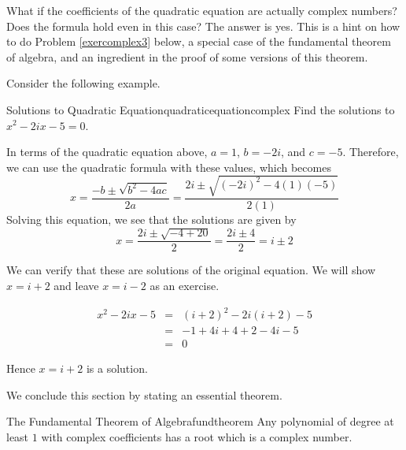 What if the coefficients of the quadratic equation are actually complex
numbers? Does the formula hold even in this case? The answer is yes. This is
a hint on how to do Problem \ref{exercomplex3} below, a special case of the
fundamental theorem of algebra, and an ingredient in the proof of some
versions of this theorem. 

Consider the following example. 

\begin{example}{Solutions to Quadratic Equation}{quadraticequationcomplex}
Find the solutions to $x^{2}-2ix-5=0$.
\end{example}

\begin{solution}
In terms of the quadratic equation above, $a=1$, $b=-2i$, and $c=-5$.
Therefore, we can use the quadratic formula with these values, which becomes
\begin{equation*}
x=
\frac{-b\pm \sqrt{b^{2}-4ac}}{2a}
= 
\frac{2i \pm \sqrt{\left(-2i\right)^{2} - 4 (1)(-5)}}{2(1)}
\end{equation*}
Solving this equation, we see that the solutions are given by
\begin{equation*}
x=\frac{2i\pm \sqrt{-4+20}}{2}=\frac{2i\pm 4}{2}=i\pm 2
\end{equation*}

We can verify that these are solutions of the original equation. 
We will show $x = i + 2$ and leave $x = i-2$ as an exercise.

\begin{eqnarray*}
x^{2}-2ix-5
&=& (i+2)^2 - 2i (i+2) - 5 \\
&=& -1 + 4i + 4 + 2 - 4i - 5 \\
&=& 0
\end{eqnarray*}

Hence $x = i+2$ is a solution. 
\end{solution}

We conclude this section by stating an essential theorem.

\begin{theorem}{The Fundamental Theorem of Algebra}{fundtheorem}
Any polynomial of degree at least $1$ with complex coefficients has a root which is a complex number.
\end{theorem}